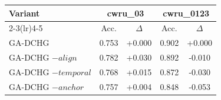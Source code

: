 \begin{tabular}{lcccc}
\toprule
Variant & \multicolumn{2}{c}{cwru\_03} & \multicolumn{2}{c}{cwru\_0123} \\
\cmidrule(lr){2-3}\cmidrule(lr){4-5}
 & Acc. & $\Delta$ & Acc. & $\Delta$ \\
\midrule
GA-DCHG & 0.753 & +0.000 & 0.902 & +0.000 \\
GA-DCHG $-align$ & 0.782 & +0.030 & 0.892 & -0.010 \\
GA-DCHG $-temporal$ & 0.768 & +0.015 & 0.872 & -0.030 \\
GA-DCHG $-anchor$ & 0.757 & +0.004 & 0.848 & -0.053 \\
\bottomrule
\end{tabular}
